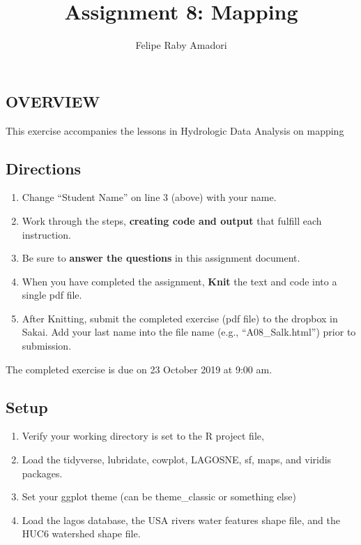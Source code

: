 \documentclass[]{article}
\title{Assignment 8: Mapping}
\author{Felipe Raby Amadori}
\date{}
\providecommand{\tightlist}{%
  \setlength{\itemsep}{0pt}\setlength{\parskip}{0pt}}
\begin{document}
\maketitle

\hypertarget{overview}{%
\subsection{OVERVIEW}\label{overview}}

This exercise accompanies the lessons in Hydrologic Data Analysis on
mapping

\hypertarget{directions}{%
\subsection{Directions}\label{directions}}

\begin{enumerate}
\def\labelenumi{\arabic{enumi}.}
\tightlist
\item
  Change ``Student Name'' on line 3 (above) with your name.
\item
  Work through the steps, \textbf{creating code and output} that fulfill
  each instruction.
\item
  Be sure to \textbf{answer the questions} in this assignment document.
\item
  When you have completed the assignment, \textbf{Knit} the text and
  code into a single pdf file.
\item
  After Knitting, submit the completed exercise (pdf file) to the
  dropbox in Sakai. Add your last name into the file name (e.g.,
  ``A08\_Salk.html'') prior to submission.
\end{enumerate}

The completed exercise is due on 23 October 2019 at 9:00 am.

\hypertarget{setup}{%
\subsection{Setup}\label{setup}}

\begin{enumerate}
\def\labelenumi{\arabic{enumi}.}
\tightlist
\item
  Verify your working directory is set to the R project file,
\item
  Load the tidyverse, lubridate, cowplot, LAGOSNE, sf, maps, and viridis
  packages.
\item
  Set your ggplot theme (can be theme\_classic or something else)
\item
  Load the lagos database, the USA rivers water features shape file, and
  the HUC6 watershed shape file.
\end{enumerate}
\end{document}
